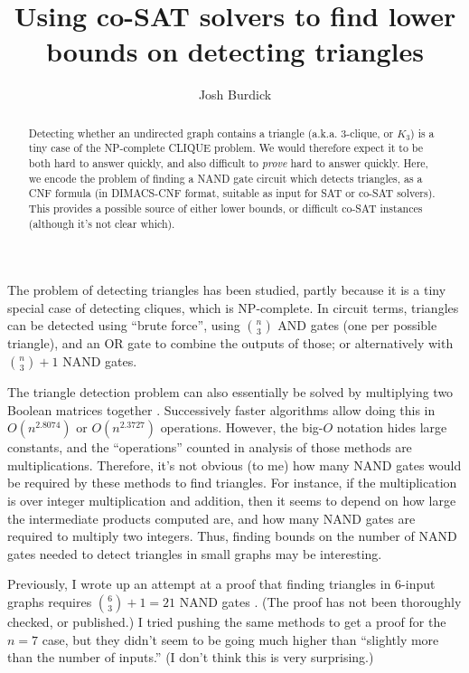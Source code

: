 \documentclass[12pt]{article}
\begin{document}
\title{Using co-SAT solvers to find lower bounds on detecting triangles}
\author{Josh Burdick}
\maketitle

\begin{abstract}
Detecting whether an undirected
graph contains a triangle (a.k.a. 3-clique, or $K_3$)
is a tiny case of the NP-complete
CLIQUE problem. We would therefore expect it to be both hard to answer
quickly, and also difficult
to {\em prove} hard to answer quickly. Here, we encode the problem of
finding a NAND gate circuit which detects triangles, as a CNF formula
(in DIMACS-CNF format,
suitable as input for SAT or co-SAT solvers). This provides a
possible source of either lower bounds, or difficult co-SAT instances
(although it's not clear which).
\end{abstract}

The problem of
detecting triangles has been studied, partly because it is a tiny special
case of detecting cliques, which is NP-complete.
In circuit terms,
triangles can be detected using ``brute force'', using ${n \choose 3}$ AND gates
(one per possible triangle), and an OR gate to combine the outputs of those;
or alternatively with
${n \choose 3} + 1$
NAND gates.

The triangle detection problem
can also essentially be solved by multiplying two Boolean matrices
together \cite{itai_finding_1977}. Successively faster algorithms allow doing this in
$O(n^{2.8074})$ \cite{strassen_gaussian_1969} or
$O(n^{2.3727})$ \cite{williams_multiplying_2012} operations. However, the big-$O$ notation
hides large constants, and the ``operations''
counted in analysis of those methods are multiplications. Therefore, 
it's not obvious (to me) how many NAND gates would be required by these
methods to find triangles.
For instance, if the multiplication is over integer multiplication and addition,
then it seems to depend
on how large the intermediate products computed are, and how many
NAND gates are required to multiply two integers.
Thus, finding bounds on the number of NAND gates needed to detect
triangles in small graphs may be interesting.

Previously, I wrote up an attempt at a proof that
finding triangles in 6-input graphs requires
${6 \choose 3} + 1 = 21$ NAND gates \cite{burdick_triangles_6_vertex}.
(The proof has not been thoroughly checked, or published.)
I tried pushing the same methods to get a proof for the
$n=7$ case, but they didn't seem to be going much higher
than ``slightly more than the number of inputs.'' 
(I don't think this is very surprising.)
\end{document}
